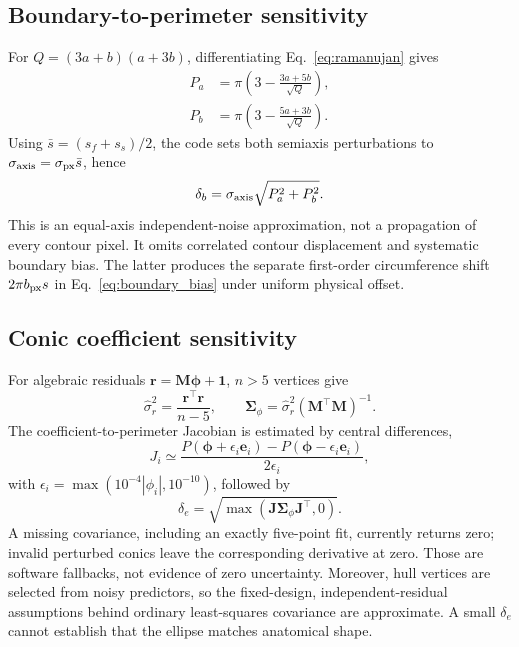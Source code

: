 \documentclass[11pt,a4paper]{article}
\numberwithin{equation}{section}
\begin{document}
\subsection{Boundary-to-perimeter sensitivity}
For $Q=(3a+b)(a+3b)$, differentiating Eq.~\eqref{eq:ramanujan} gives
\begin{align}
P_a&=\pi\left(3-\frac{3a+5b}{\sqrt Q}\right),\label{eq:ramanujan_partial_a}\\
P_b&=\pi\left(3-\frac{5a+3b}{\sqrt Q}\right).\label{eq:ramanujan_partial_b}
\end{align}
Using $\bar s=(s_f+s_s)/2$, the code sets both semiaxis perturbations to $\sigma_{\rm axis}=\sigma_{\rm px}\bar s$, hence
\begin{equation}
\delta_b=\sigma_{\rm axis}\sqrt{P_a^2+P_b^2}.
\end{equation}
This is an equal-axis independent-noise approximation, not a propagation of every contour pixel. It omits correlated contour displacement and systematic boundary bias. The latter produces the separate first-order circumference shift $2\pi b_{\rm px}s$ in Eq.~\eqref{eq:boundary_bias} under uniform physical offset.

\subsection{Conic coefficient sensitivity}
For algebraic residuals $\mathbf r=\mathbf M\boldsymbol\phi+\mathbf1$, $n>5$ vertices give
\begin{equation}
\hat\sigma_r^2=\frac{\mathbf r^\top\mathbf r}{n-5},\qquad
\mathbf\Sigma_\phi=\hat\sigma_r^2(\mathbf M^\top\mathbf M)^{-1}.
\end{equation}
The coefficient-to-perimeter Jacobian is estimated by central differences,
\begin{equation}
J_i\simeq\frac{P(\boldsymbol\phi+\epsilon_i\mathbf e_i)-P(\boldsymbol\phi-\epsilon_i\mathbf e_i)}{2\epsilon_i},
\end{equation}
with $\epsilon_i=\max(10^{-4}|\phi_i|,10^{-10})$, followed by
\begin{equation}
\delta_e=\sqrt{\max(\mathbf J\mathbf\Sigma_\phi\mathbf J^\top,0)}.
\end{equation}
A missing covariance, including an exactly five-point fit, currently returns zero; invalid perturbed conics leave the corresponding derivative at zero. Those are software fallbacks, not evidence of zero uncertainty. Moreover, hull vertices are selected from noisy predictors, so the fixed-design, independent-residual assumptions behind ordinary least-squares covariance are approximate. A small $\delta_e$ cannot establish that the ellipse matches anatomical shape.
\end{document}
